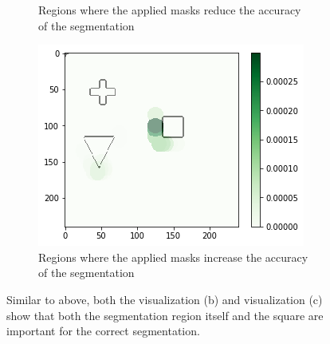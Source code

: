 \begin{figure}[H]
\begin{subfigure}[t]{.34\textwidth}
        \caption{Regions where the applied masks reduce the accuracy of the segmentation}
    \end{subfigure}\hfill%
    \begin{subfigure}[t]{.34\textwidth}
        \centering
        \includegraphics[width=\linewidth]{chapters/06_hdm/testnet/7.png}
        \caption{Regions where the applied masks increase the accuracy of the segmentation}
    \end{subfigure}
    \caption{Similar to above, both the visualization (b) and visualization (c) show that both the segmentation region itself and the square are important for the correct segmentation.}
    \label{hdm_testnet_2}
\end{figure}

